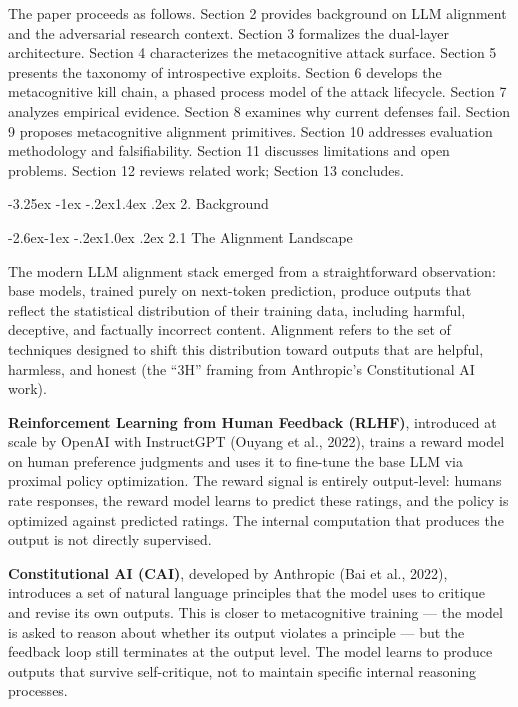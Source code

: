 \documentclass[
  11pt,
]{article}
\makeatletter
\renewcommand\section{\@startsection{section}{1}{\z@}%
  {-3.25ex \@plus -1ex \@minus -.2ex}{1.4ex \@plus.2ex}%
  {\normalfont\sffamily\Large\bfseries}}
\renewcommand\subsection{\@startsection{subsection}{2}{\z@}%
  {-2.6ex\@plus -1ex \@minus -.2ex}{1.0ex \@plus .2ex}%
  {\normalfont\sffamily\large\bfseries}}
\makeatother
\begin{document}
The paper proceeds as follows. Section 2 provides background on LLM
alignment and the adversarial research context. Section 3 formalizes the
dual-layer architecture. Section 4 characterizes the metacognitive
attack surface. Section 5 presents the taxonomy of introspective
exploits. Section 6 develops the metacognitive kill chain, a phased process model of the attack lifecycle. Section 7 analyzes empirical evidence. Section 8 examines why current defenses fail. Section 9 proposes metacognitive alignment primitives. Section 10 addresses evaluation methodology and falsifiability. Section 11 discusses limitations and open problems. Section 12 reviews related work; Section 13 concludes.

\section{2. Background}\label{background}

\subsection{2.1 The Alignment Landscape}\label{the-alignment-landscape}

The modern LLM alignment stack emerged from a straightforward
observation: base models, trained purely on next-token prediction,
produce outputs that reflect the statistical distribution of their
training data, including harmful, deceptive, and factually incorrect
content. Alignment refers to the set of techniques designed to shift
this distribution toward outputs that are helpful, harmless, and honest
(the ``3H'' framing from Anthropic's Constitutional AI work).

\textbf{Reinforcement Learning from Human Feedback (RLHF)}, introduced
at scale by OpenAI with InstructGPT (Ouyang et al., 2022), trains a
reward model on human preference judgments and uses it to fine-tune the
base LLM via proximal policy optimization. The reward signal is entirely
output-level: humans rate responses, the reward model learns to predict
these ratings, and the policy is optimized against predicted ratings.
The internal computation that produces the output is not directly
supervised.

\textbf{Constitutional AI (CAI)}, developed by Anthropic (Bai et al.,
2022), introduces a set of natural language principles that the model
uses to critique and revise its own outputs. This is closer to
metacognitive training --- the model is asked to reason about whether
its output violates a principle --- but the feedback loop still
terminates at the output level. The model learns to produce outputs that
survive self-critique, not to maintain specific internal reasoning
processes.
\end{document}

